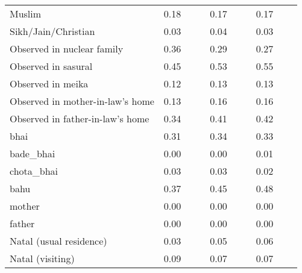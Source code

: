 {\begin{tabular}{l*{3}{ccc}}
Muslim              &        0.18&            &            &        0.17&            &            &        0.17&            &            \\
Sikh/Jain/Christian &        0.03&            &            &        0.04&            &            &        0.03&            &            \\
Observed in nuclear family&        0.36&            &            &        0.29&            &            &        0.27&            &            \\
Observed in sasural &        0.45&            &            &        0.53&            &            &        0.55&            &            \\
Observed in meika   &        0.12&            &            &        0.13&            &            &        0.13&            &            \\
Observed in mother-in-law's home&        0.13&            &            &        0.16&            &            &        0.16&            &            \\
Observed in father-in-law's home&        0.34&            &            &        0.41&            &            &        0.42&            &            \\
bhai                &        0.31&            &            &        0.34&            &            &        0.33&            &            \\
bade\_bhai           &        0.00&            &            &        0.00&            &            &        0.01&            &            \\
chota\_bhai          &        0.03&            &            &        0.03&            &            &        0.02&            &            \\
bahu                &        0.37&            &            &        0.45&            &            &        0.48&            &            \\
mother              &        0.00&            &            &        0.00&            &            &        0.00&            &            \\
father              &        0.00&            &            &        0.00&            &            &        0.00&            &            \\
Natal (usual residence)&        0.03&            &            &        0.05&            &            &        0.06&            &            \\
Natal (visiting)    &        0.09&            &            &        0.07&            &            &        0.07&            &            \\

\end{tabular}}

